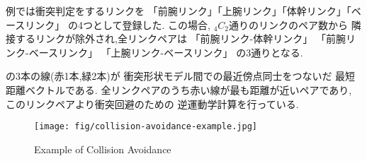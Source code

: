 
例では衝突判定をするリンクを
「前腕リンク」「上腕リンク」「体幹リンク」「ベースリンク」
の4つとして登録した.
この場合, $_4C_2$通りのリンクのペア数から
隣接するリンクが除外され,全リンクペアは
「前腕リンク-体幹リンク」
「前腕リンク-ベースリンク」
「上腕リンク-ベースリンク」
の3通りとなる.

の3本の線(赤1本,緑2本)が
衝突形状モデル間での最近傍点同士をつないだ
最短距離ベクトルである.
全リンクペアのうち赤い線が最も距離が近いペアであり,
このリンクペアより衝突回避のための
逆運動学計算を行っている.

\begin{figure}[htb]
  \begin{center}
    \texttt{[image: fig/collision-avoidance-example.jpg]}
    \caption{Example of Collision Avoidance}
  \end{center}
\end{figure}



